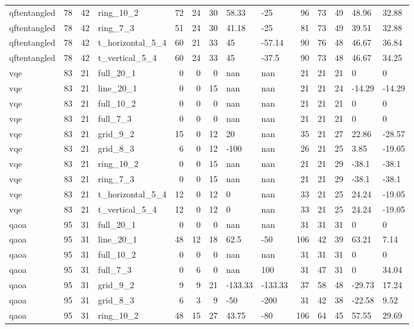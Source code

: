 \begin{longtable}{lrrlrrrllrrrll}
qftentangled & 78 & 42 & ring\_10\_2 & 72 & 24 & 30 & 58.33 & -25 & 96 & 73 & 49 & 48.96 & 32.88 \\
qftentangled & 78 & 42 & ring\_7\_3 & 51 & 24 & 30 & 41.18 & -25 & 81 & 73 & 49 & 39.51 & 32.88 \\
qftentangled & 78 & 42 & t\_horizontal\_5\_4 & 60 & 21 & 33 & 45 & -57.14 & 90 & 76 & 48 & 46.67 & 36.84 \\
qftentangled & 78 & 42 & t\_vertical\_5\_4 & 60 & 24 & 33 & 45 & -37.5 & 90 & 73 & 48 & 46.67 & 34.25 \\
vqe & 83 & 21 & full\_20\_1 & 0 & 0 & 0 & nan & nan & 21 & 21 & 21 & 0 & 0 \\
vqe & 83 & 21 & line\_20\_1 & 0 & 0 & 15 & nan & nan & 21 & 21 & 24 & -14.29 & -14.29 \\
vqe & 83 & 21 & full\_10\_2 & 0 & 0 & 0 & nan & nan & 21 & 21 & 21 & 0 & 0 \\
vqe & 83 & 21 & full\_7\_3 & 0 & 0 & 0 & nan & nan & 21 & 21 & 21 & 0 & 0 \\
vqe & 83 & 21 & grid\_9\_2 & 15 & 0 & 12 & 20 & nan & 35 & 21 & 27 & 22.86 & -28.57 \\
vqe & 83 & 21 & grid\_8\_3 & 6 & 0 & 12 & -100 & nan & 26 & 21 & 25 & 3.85 & -19.05 \\
vqe & 83 & 21 & ring\_10\_2 & 0 & 0 & 15 & nan & nan & 21 & 21 & 29 & -38.1 & -38.1 \\
vqe & 83 & 21 & ring\_7\_3 & 0 & 0 & 15 & nan & nan & 21 & 21 & 29 & -38.1 & -38.1 \\
vqe & 83 & 21 & t\_horizontal\_5\_4 & 12 & 0 & 12 & 0 & nan & 33 & 21 & 25 & 24.24 & -19.05 \\
vqe & 83 & 21 & t\_vertical\_5\_4 & 12 & 0 & 12 & 0 & nan & 33 & 21 & 25 & 24.24 & -19.05 \\
qaoa & 95 & 31 & full\_20\_1 & 0 & 0 & 0 & nan & nan & 31 & 31 & 31 & 0 & 0 \\
qaoa & 95 & 31 & line\_20\_1 & 48 & 12 & 18 & 62.5 & -50 & 106 & 42 & 39 & 63.21 & 7.14 \\
qaoa & 95 & 31 & full\_10\_2 & 0 & 0 & 0 & nan & nan & 31 & 31 & 31 & 0 & 0 \\
qaoa & 95 & 31 & full\_7\_3 & 0 & 6 & 0 & nan & 100 & 31 & 47 & 31 & 0 & 34.04 \\
qaoa & 95 & 31 & grid\_9\_2 & 9 & 9 & 21 & -133.33 & -133.33 & 37 & 58 & 48 & -29.73 & 17.24 \\
qaoa & 95 & 31 & grid\_8\_3 & 6 & 3 & 9 & -50 & -200 & 31 & 42 & 38 & -22.58 & 9.52 \\
qaoa & 95 & 31 & ring\_10\_2 & 48 & 15 & 27 & 43.75 & -80 & 106 & 64 & 45 & 57.55 & 29.69 \\

\end{longtable}
